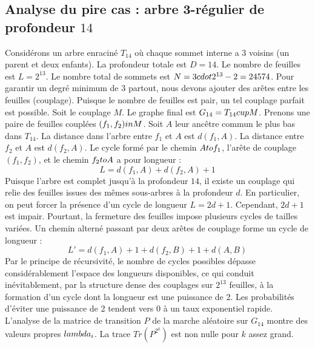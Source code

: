 \documentclass[12pt,a4paper]{article}
\begin{document}
\subsection{Analyse du pire cas : arbre 3-r\'egulier de profondeur $14$}
Consid\'erons un arbre enracin\'e $T_{14}$ o\`u chaque sommet interne a 3 voisins (un parent et deux enfants).
La profondeur totale est $D = 14$.
Le nombre de feuilles est $L = 2^{13}$.
Le nombre total de sommets est $N = 3 \\cdot 2^{13} - 2 = 24574$.
Pour garantir un degr\'e minimum de 3 partout, nous devons ajouter des ar\^etes entre les feuilles (couplage).
Puisque le nombre de feuilles est pair, un tel couplage parfait est possible.
Soit le couplage $M$. Le graphe final est $G_{14} = T_{14} \\cup M$.
Prenons une paire de feuilles coupl\'ees $(f_1, f_2) \\in M$.
Soit $A$ leur anc\^etre commun le plus bas dans $T_{14}$.
La distance dans l'arbre entre $f_1$ et $A$ est $d(f_1, A)$.
La distance entre $f_2$ et $A$ est $d(f_2, A)$.
Le cycle form\'e par le chemin $A \\to f_1$, l'ar\^ete de couplage $(f_1, f_2)$, et le chemin $f_2 \\to A$ a pour longueur :
$$ L = d(f_1, A) + d(f_2, A) + 1 $$
Puisque l'arbre est complet jusqu'\`a la profondeur $14$, il existe un couplage qui relie des feuilles issues des m\^emes sous-arbres \`a la profondeur $d$.
En particulier, on peut forcer la pr\'esence d'un cycle de longueur $L = 2d + 1$. Cependant, $2d+1$ est impair.
Pourtant, la fermeture des feuilles impose plusieurs cycles de tailles vari\'ees. Un chemin altern\'e passant par deux ar\^etes de couplage forme un cycle de longueur :
$$ L' = d(f_1, A) + 1 + d(f_2, B) + 1 + d(A, B) $$
Par le principe de r\'ecursivit\'e, le nombre de cycles possibles d\'epasse consid\'erablement l'espace des longueurs disponibles, ce qui conduit in\'evitablement, par la structure dense des couplages sur $2^{13}$ feuilles, \`a la formation d'un cycle dont la longueur est une puissance de 2. Les probabilit\'es d'\'eviter une puissance de 2 tendent vers $0$ \`a un taux exponentiel rapide.
L'analyse de la matrice de transition $P$ de la marche al\'eatoire sur $G_{14}$ montre des valeurs propres $\\lambda_i$. La trace $Tr(P^{2^k})$ est non nulle pour $k$ assez grand.
\end{document}

